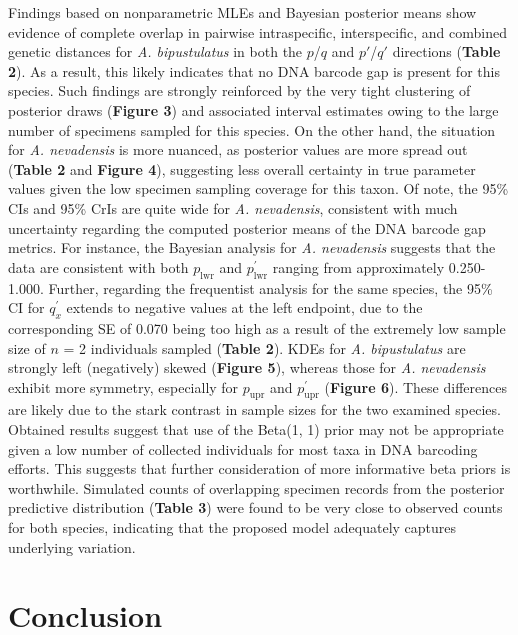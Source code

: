 \documentclass[12pt]{article}
\begin{document}
Findings based on nonparametric MLEs and Bayesian posterior means show evidence of complete overlap in pairwise intraspecific, interspecific, and combined genetic distances for \textit{A. bipustulatus} in both the $p$/$q$ and $p'$/$q'$ directions (\textbf{Table 2}). As a result, this likely indicates that no DNA barcode gap is present for this species. Such findings are strongly reinforced by the very tight clustering of posterior draws (\textbf{Figure 3}) and associated interval estimates owing to the large number of specimens sampled for this species. On the other hand, the situation for \textit{A. nevadensis} is more nuanced, as posterior values are more spread out (\textbf{Table 2} and \textbf{Figure 4}), suggesting less overall certainty in true parameter values given the low specimen sampling coverage for this taxon. Of note, the 95\% CIs and 95\% CrIs are quite wide for \textit{A. nevadensis}, consistent with much uncertainty regarding the computed posterior means of the DNA barcode gap metrics. For instance, the Bayesian analysis for \textit{A. nevadensis} suggests that the data are consistent with both $p_{\mathrm{lwr}}$ and $p^{'}_{\mathrm{lwr}}$ ranging from approximately 0.250-1.000. Further, regarding the frequentist analysis for the same species, the 95\% CI for $q^{'}_x$ extends to negative values at the left endpoint, due to the corresponding SE of 0.070 being too high as a result of the extremely low sample size of $n$ = 2 individuals sampled (\textbf{Table 2}). KDEs for \textit{A. bipustulatus} are strongly left (negatively) skewed (\textbf{Figure 5}), whereas those for \textit{A. nevadensis} exhibit more symmetry, especially for $p_{\mathrm{upr}}$ and $p^{'}_{\mathrm{upr}}$ (\textbf{Figure 6}). These differences are likely due to the stark contrast in sample sizes for the two examined species. Obtained results suggest that use of the Beta(1, 1) prior may not be appropriate given a low number of collected individuals for most taxa in DNA barcoding efforts. This suggests that further consideration of more informative beta priors is worthwhile. Simulated counts of overlapping specimen records from the posterior predictive distribution (\textbf{Table 3}) were found to be very close to observed counts for both species, indicating that the proposed model adequately captures underlying variation. 

\section{Conclusion}
\end{document}
